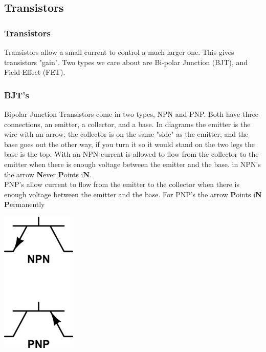 \documentclass[10pt]{beamer}
\begin{document}
\subsection{Transistors}
\begin{frame}
\frametitle{Transistors}
Transistors allow a small current to control a much larger one. This gives transistors "gain". Two types we care about are Bi-polar Junction (BJT), and Field Effect (FET).
\end{frame}

\begin{frame}
\frametitle{BJT's}
Bipolar Junction Transistors come in two types, NPN and PNP. Both have three connections, an emitter, a collector, and a base. In diagrams the emitter is the wire with an arrow, the collector is on the same "side" as the emitter, and the base goes out the other way, if you turn it so it would stand on the two legs the base is the top. With an NPN current is allowed to flow from the collector to the emitter when there is enough voltage between the emitter and the base. in NPN's the arrow \textbf{N}ever \textbf{P}oints i\textbf{N}.\\PNP's allow current to flow from the emitter to the collector when there is enough voltage between the emitter and the base. For PNP's the arrow \textbf{P}oints i\textbf{N} \textbf{P}ermanently\\
\begin{center}
\includegraphics{bjts.png}
\end{center}
\end{frame}
\end{document}
